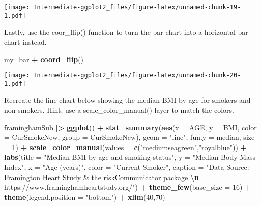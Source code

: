 \documentclass[
]{article}
\newenvironment{Shaded}{\begin{snugshade}}{\end{snugshade}}
\newcommand{\AttributeTok}[1]{\textcolor[rgb]{0.13,0.29,0.53}{#1}}
\newcommand{\DecValTok}[1]{\textcolor[rgb]{0.00,0.00,0.81}{#1}}
\newcommand{\FunctionTok}[1]{\textcolor[rgb]{0.13,0.29,0.53}{\textbf{#1}}}
\newcommand{\NormalTok}[1]{#1}
\newcommand{\SpecialCharTok}[1]{\textcolor[rgb]{0.81,0.36,0.00}{\textbf{#1}}}
\newcommand{\StringTok}[1]{\textcolor[rgb]{0.31,0.60,0.02}{#1}}
\begin{document}
\texttt{[image: Intermediate-ggplot2\_files/figure-latex/unnamed-chunk-19-1.pdf]}

Lastly, use the coor\_flip() function to turn the bar chart into a
horizontal bar chart instead.

\begin{Shaded}
\begin{Highlighting}[]
\NormalTok{my\_bar }\SpecialCharTok{+}
  \FunctionTok{coord\_flip}\NormalTok{()}
\end{Highlighting}
\end{Shaded}

\texttt{[image: Intermediate-ggplot2\_files/figure-latex/unnamed-chunk-20-1.pdf]}

Recreate the line chart below showing the median BMI by age for smokers
and non-smokers. Hint: use a scale\_color\_manual() layer to match the
colors.

\begin{Shaded}
\begin{Highlighting}[]
\NormalTok{framinghamSub }\SpecialCharTok{|\textgreater{}}
  \FunctionTok{ggplot}\NormalTok{() }\SpecialCharTok{+}
  \FunctionTok{stat\_summary}\NormalTok{(}\FunctionTok{aes}\NormalTok{(}\AttributeTok{x =}\NormalTok{ AGE,}
                   \AttributeTok{y =}\NormalTok{ BMI,}
                   \AttributeTok{color =}\NormalTok{ CurSmokeNew,}
                   \AttributeTok{group =}\NormalTok{ CurSmokeNew),}
               \AttributeTok{geom =} \StringTok{"line"}\NormalTok{,}
               \AttributeTok{fun.y =}\NormalTok{ median,}
               \AttributeTok{size =} \DecValTok{1}\NormalTok{) }\SpecialCharTok{+}
  \FunctionTok{scale\_color\_manual}\NormalTok{(}\AttributeTok{values =} \FunctionTok{c}\NormalTok{(}\StringTok{"mediumseagreen"}\NormalTok{,}\StringTok{"royalblue"}\NormalTok{)) }\SpecialCharTok{+}
  \FunctionTok{labs}\NormalTok{(}\AttributeTok{title =} \StringTok{"Median BMI by age and smoking status"}\NormalTok{,}
       \AttributeTok{y =} \StringTok{"Median Body Mass Index"}\NormalTok{,}
       \AttributeTok{x =} \StringTok{"Age (years)"}\NormalTok{,}
       \AttributeTok{color =} \StringTok{"Current Smoker"}\NormalTok{,}
       \AttributeTok{caption =} \StringTok{"Data Source: Framington Heart Study \& the riskCommunicator package }\SpecialCharTok{\textbackslash{}n}\StringTok{ https://www.framinghamheartstudy.org/"}\NormalTok{) }\SpecialCharTok{+}
  \FunctionTok{theme\_few}\NormalTok{(}\AttributeTok{base\_size =} \DecValTok{16}\NormalTok{) }\SpecialCharTok{+}
  \FunctionTok{theme}\NormalTok{(}\AttributeTok{legend.position =} \StringTok{"bottom"}\NormalTok{) }\SpecialCharTok{+}
  \FunctionTok{xlim}\NormalTok{(}\DecValTok{40}\NormalTok{,}\DecValTok{70}\NormalTok{)}
\end{Highlighting}
\end{Shaded}
\end{document}
